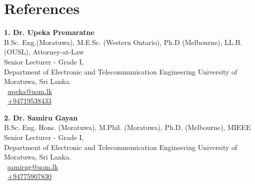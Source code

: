 \documentclass[10pt,a4paper]{article}
\begin{document}










\section*{References}


\textbf{1. Dr. Upeka Premaratne}\\
B.Sc. Eng.(Moratuwa), M.E.Sc. (Western Ontario), Ph.D (Melbourne), LL.B. (OUSL), Attorney-at-Law\\
Senior Lecturer - Grade I,\\
Department of Electronic and Telecommunication Engineering University of Moratuwa, Sri Lanka.\\
\faEnvelope\ \href{mailto:upeka@uom.lk}{upeka@uom.lk} \\
\faPhone\ \href{tel:+94719538433}{+94719538433} 



\vspace{0.3cm}
\textbf{2. Dr. Samiru Gayan}\\
B.Sc. Eng. Hons. (Moratuwa), M.Phil. (Moratuwa), Ph.D. (Melbourne), MIEEE\\
Senior Lecturer - Grade I,\\
Department of Electronic and Telecommunication Engineering University of Moratuwa, Sri Lanka.\\
\faEnvelope\ \href{mailto:samirug@uom.lk}{samirug@uom.lk} \\
\faPhone\ \href{tel:+94775907830}{+94775907830} 
\end{document}

